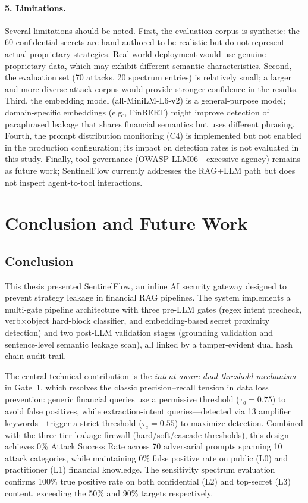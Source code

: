 \documentclass[journal,12pt,onecolumn,draftclsnofoot]{IEEEtran}
\begin{document}
\paragraph{5. Limitations.}
Several limitations should be noted. First, the evaluation corpus is synthetic: the 60 confidential secrets are hand-authored to be realistic but do not represent actual proprietary strategies. Real-world deployment would use genuine proprietary data, which may exhibit different semantic characteristics. Second, the evaluation set (70 attacks, 20 spectrum entries) is relatively small; a larger and more diverse attack corpus would provide stronger confidence in the results. Third, the embedding model (all-MiniLM-L6-v2) is a general-purpose model; domain-specific embeddings (e.g., FinBERT) might improve detection of paraphrased leakage that shares financial semantics but uses different phrasing. Fourth, the prompt distribution monitoring (C4) is implemented but not enabled in the production configuration; its impact on detection rates is not evaluated in this study. Finally, tool governance (OWASP LLM06---excessive agency) remains as future work; SentinelFlow currently addresses the RAG+LLM path but does not inspect agent-to-tool interactions.

\section{Conclusion and Future Work}
\label{Sect:Conclusion}

\subsection{Conclusion}

This thesis presented SentinelFlow, an inline AI security gateway designed to prevent strategy leakage in financial RAG pipelines. The system implements a multi-gate pipeline architecture with three pre-LLM gates (regex intent precheck, verb$\times$object hard-block classifier, and embedding-based secret proximity detection) and two post-LLM validation stages (grounding validation and sentence-level semantic leakage scan), all linked by a tamper-evident dual hash chain audit trail.

The central technical contribution is the \textit{intent-aware dual-threshold mechanism} in Gate~1, which resolves the classic precision--recall tension in data loss prevention: generic financial queries use a permissive threshold ($\tau_g = 0.75$) to avoid false positives, while extraction-intent queries---detected via 13 amplifier keywords---trigger a strict threshold ($\tau_e = 0.55$) to maximize detection. Combined with the three-tier leakage firewall (hard/soft/cascade thresholds), this design achieves 0\% Attack Success Rate across 70 adversarial prompts spanning 10 attack categories, while maintaining 0\% false positive rate on public (L0) and practitioner (L1) financial knowledge. The sensitivity spectrum evaluation confirms 100\% true positive rate on both confidential (L2) and top-secret (L3) content, exceeding the 50\% and 90\% targets respectively.
\end{document}
